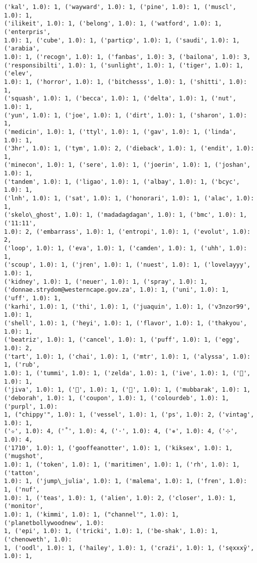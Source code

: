 \documentclass[11pt]{article}
\begin{document}
\begin{Verbatim}[commandchars=\\\{\}]
('kal', 1.0): 1, ('wayward', 1.0): 1, ('pine', 1.0): 1, ('muscl', 1.0): 1,
('ilikeit', 1.0): 1, ('belong', 1.0): 1, ('watford', 1.0): 1, ('enterpris',
1.0): 1, ('cube', 1.0): 1, ('particp', 1.0): 1, ('saudi', 1.0): 1, ('arabia',
1.0): 1, ('recogn', 1.0): 1, ('fanbas', 1.0): 3, ('bailona', 1.0): 3,
('responsibilti', 1.0): 1, ('sunlight', 1.0): 1, ('tiger', 1.0): 1, ('elev',
1.0): 1, ('horror', 1.0): 1, ('bitchesss', 1.0): 1, ('shitti', 1.0): 1,
('squash', 1.0): 1, ('becca', 1.0): 1, ('delta', 1.0): 1, ('nut', 1.0): 1,
('yun', 1.0): 1, ('joe', 1.0): 1, ('dirt', 1.0): 1, ('sharon', 1.0): 1,
('medicin', 1.0): 1, ('ttyl', 1.0): 1, ('gav', 1.0): 1, ('linda', 1.0): 1,
('3hr', 1.0): 1, ('tym', 1.0): 2, ('dieback', 1.0): 1, ('endit', 1.0): 1,
('minecon', 1.0): 1, ('sere', 1.0): 1, ('joerin', 1.0): 1, ('joshan', 1.0): 1,
('tandem', 1.0): 1, ('ligao', 1.0): 1, ('albay', 1.0): 1, ('bcyc', 1.0): 1,
('lnh', 1.0): 1, ('sat', 1.0): 1, ('honorari', 1.0): 1, ('alac', 1.0): 1,
('skelo\_ghost', 1.0): 1, ('madadagdagan', 1.0): 1, ('bmc', 1.0): 1, ('11:11',
1.0): 2, ('embarrass', 1.0): 1, ('entropi', 1.0): 1, ('evolut', 1.0): 2,
('loop', 1.0): 1, ('eva', 1.0): 1, ('camden', 1.0): 1, ('uhh', 1.0): 1,
('scoup', 1.0): 1, ('jren', 1.0): 1, ('nuest', 1.0): 1, ('lovelayyy', 1.0): 1,
('kidney', 1.0): 1, ('neuer', 1.0): 1, ('spray', 1.0): 1,
('donnae.strydom@westerncape.gov.za', 1.0): 1, ('uni', 1.0): 1, ('uff', 1.0): 1,
('karhi', 1.0): 1, ('thi', 1.0): 1, ('juaquin', 1.0): 1, ('v3nzor99', 1.0): 1,
('shell', 1.0): 1, ('heyi', 1.0): 1, ('flavor', 1.0): 1, ('thakyou', 1.0): 1,
('beatriz', 1.0): 1, ('cancel', 1.0): 1, ('puff', 1.0): 1, ('egg', 1.0): 2,
('tart', 1.0): 1, ('chai', 1.0): 1, ('mtr', 1.0): 1, ('alyssa', 1.0): 1, ('rub',
1.0): 1, ('tummi', 1.0): 1, ('zelda', 1.0): 1, ('ive', 1.0): 1, ('🎂', 1.0): 1,
('jiva', 1.0): 1, ('🍹', 1.0): 1, ('🍻', 1.0): 1, ('mubbarak', 1.0): 1,
('deborah', 1.0): 1, ('coupon', 1.0): 1, ('colourdeb', 1.0): 1, ('purpl', 1.0):
1, ("chippy'", 1.0): 1, ('vessel', 1.0): 1, ('ps', 1.0): 2, ('vintag', 1.0): 1,
('✫', 1.0): 4, ('˚', 1.0): 4, ('·', 1.0): 4, ('✵', 1.0): 4, ('⊹', 1.0): 4,
('1710', 1.0): 1, ('gooffeanotter', 1.0): 1, ('kiksex', 1.0): 1, ('mugshot',
1.0): 1, ('token', 1.0): 1, ('maritimen', 1.0): 1, ('rh', 1.0): 1, ('tatton',
1.0): 1, ('jump\_julia', 1.0): 1, ('malema', 1.0): 1, ('fren', 1.0): 1, ('nuf',
1.0): 1, ('teas', 1.0): 1, ('alien', 1.0): 2, ('closer', 1.0): 1, ('monitor',
1.0): 1, ('kimmi', 1.0): 1, ("channel'", 1.0): 1, ('planetbollywoodnew', 1.0):
1, ('epi', 1.0): 1, ('tricki', 1.0): 1, ('be-shak', 1.0): 1, ('chenoweth', 1.0):
1, ('oodl', 1.0): 1, ('hailey', 1.0): 1, ('craźi', 1.0): 1, ('sęxxxÿ', 1.0): 1,

\end{Verbatim}
\end{document}
